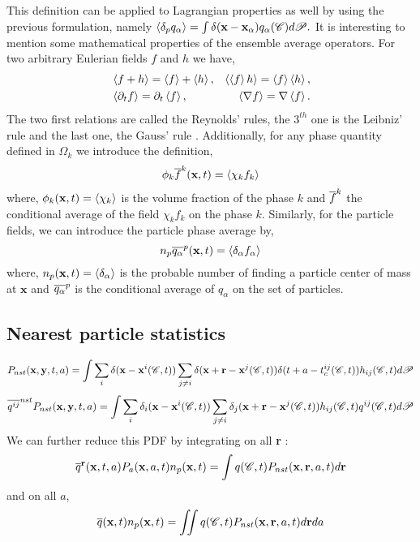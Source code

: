 \documentclass[12pt]{My_preprint}
\begin{document}
This definition can be applied to Lagrangian properties as well by using the previous formulation, namely $\left<\delta_p q_\alpha\right> = \int \delta(\textbf{x} - \textbf{x}_\alpha) q_\alpha(\mathscr{C}) d\mathscr{P}. $
It is interesting to mention some mathematical properties of the ensemble average operators. 
For two arbitrary Eulerian fields $f$ and $h$ we have,
\begin{align}
    &\avg{f+h} = \avg{f}+\avg{h}, 
    &\avg{\avg{f}h} = \avg{f}\avg{h}, \nonumber \\
    &\avg{\pddt f} 
    = \pddt\avg{f}, 
    &\avg{\grad f}
    = \grad \avg{f}. 
    \label{eq:avg_properties}
\end{align}
The two first relations are called the Reynolds' rules, the $3^{th}$ one is the Leibniz' 
rule and the last one, the Gauss' rule \citep{drew1983mathematical}.
Additionally, for any phase quantity defined in $\Omega_k$ we introduce the definition, 
\begin{equation}
    \phi_k\kavg{f}(\textbf{x},t) = \avg{\chi_k f_k}
    \label{eq:1_avg}
\end{equation}
where, $\phi_k(\textbf{x},t) = \left<\chi_k\right>$ is the volume fraction of the phase $k$
and $\overline{f}^k$ the conditional average of the field $\chi_k f_k$ on the phase $k$.
Similarly, for the particle fields, we can introduce the particle phase average by,
\begin{equation}
     \pnavg{q_\alpha}(\textbf{x},t) = \avg{\delta_\alpha f_\alpha}
     \label{eq:p_avg}
\end{equation}
where, $n_p(\textbf{x},t) = \left<\delta_\alpha\right>$ is the probable number of finding a particle center of mass at $\textbf{x}$
and $\overline{q_\alpha}^{p}$ is the conditional average of $q_\alpha$ on the set of particles. 
\subsection{Nearest particle statistics}

\begin{equation}
    P_{nst}(\textbf{x},\textbf{y},t,a)= 
    \int \sum_{i}\delta(\textbf{x}-\textbf{x}^i(\CC,t))
    \sum_{j\neq i}\delta(\textbf{x}+\textbf{r}-\textbf{x}^j(\CC,t)) 
    \delta(t+a-t_c^{ij}(\CC,t)) 
    h_{ij}(\CC,t) d\mathscr{P} 
    \label{eq:P_nst}
\end{equation}
\begin{equation}
    \nstavg{q^{ij}}P_{nst}(\textbf{x},\textbf{y},t,a)= \int \sum_{i}\delta_i(\textbf{x}-\textbf{x}^i(\CC,t))
    \sum_{j\neq i}\delta_j(\textbf{x}+\textbf{r}-\textbf{x}^j(\CC,t)) h_{ij}(\CC,t) q^{ij}(\CC,t) d\mathscr{P} 
    \label{eq:q_nst_avg}
\end{equation}
We can further reduce this PDF by integrating on all \textbf{r} : 
\begin{equation}
    \overline{q}^{\textbf{r}}(\textbf{x},t,a)P_a(\textbf{x},a,t)n_p(\textbf{x},t)
    = \int q(\mathscr{C},t) P_{nst}(\textbf{x},\textbf{r},a,t) d\textbf{r}
\end{equation}
and on all $a$, 
\begin{equation}
    \overline{q}(\textbf{x},t)n_p(\textbf{x},t)
    = \iint q(\mathscr{C},t) P_{nst}(\textbf{x},\textbf{r},a,t) d\textbf{r}da
\end{equation}
\end{document}
